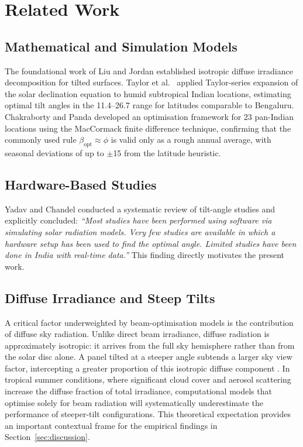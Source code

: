 \documentclass[conference]{IEEEtran}
\begin{document}
\section{Related Work}
\label{sec:background}

\subsection{Mathematical and Simulation Models}

The foundational work of Liu and Jordan \cite{liu1963} established isotropic diffuse irradiance
decomposition for tilted surfaces. Taylor et al.\ \cite{taylor2022} applied Taylor-series
expansion of the solar declination equation to humid subtropical Indian locations, estimating
optimal tilt angles in the 11.4\degree{}--26.7\degree{} range for latitudes comparable to
Bengaluru. Chakraborty and Panda \cite{chakraborty2024} developed an optimisation framework for
23 pan-Indian locations using the MacCormack finite difference technique, confirming that the
commonly used rule $\beta_{\text{opt}} \approx \phi$ is valid only as a rough annual average,
with seasonal deviations of up to $\pm$15\degree{} from the latitude heuristic.

\subsection{Hardware-Based Studies}

Yadav and Chandel \cite{yadav2013} conducted a systematic review of tilt-angle studies and
explicitly concluded: \textit{``Most studies have been performed using software via simulating
solar radiation models. Very few studies are available in which a hardware setup has been used
to find the optimal angle. Limited studies have been done in India with real-time data.''}
This finding directly motivates the present work.

\subsection{Diffuse Irradiance and Steep Tilts}

A critical factor underweighted by beam-optimisation models is the contribution of diffuse
sky radiation. Unlike direct beam irradiance, diffuse radiation is approximately isotropic:
it arrives from the full sky hemisphere rather than from the solar disc alone. A panel tilted
at a steeper angle subtends a larger sky view factor, intercepting a greater proportion of
this isotropic diffuse component \cite{perez1990}. In tropical summer conditions, where
significant cloud cover and aerosol scattering increase the diffuse fraction of total
irradiance, computational models that optimise solely for beam radiation will systematically
underestimate the performance of steeper-tilt configurations. This theoretical expectation
provides an important contextual frame for the empirical findings in Section~\ref{sec:discussion}.
\end{document}
